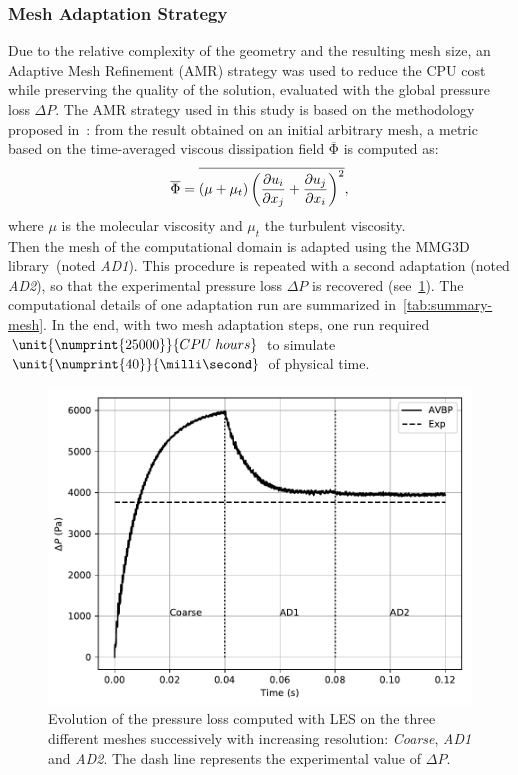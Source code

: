 \subsubsection{Mesh Adaptation Strategy}
Due to the relative complexity of the geometry and the resulting mesh size, an Adaptive Mesh Refinement (AMR) strategy was used to reduce the CPU cost while preserving the quality of the solution, evaluated with the global pressure loss $\Delta P$. The AMR strategy used in this study is based on the methodology proposed in~\cite{Daviller2017}: from the result obtained on an initial arbitrary mesh, a metric based on the time-averaged viscous dissipation field $\mathrm{\overline{\Phi}}$ is computed as: 
\begin{equation}\label{eq:phi}
\mathrm{\overline{\Phi}} = \overline {( \mu + \mu_t) \left(\frac{\partial{u_i}}{\partial{x_j}} + \frac{\partial{u_j}}{\partial{x_i}}\right)^2 },
\end{equation}
where $\mu$ is the molecular viscosity and $\mu_t$ the turbulent viscosity.\\
Then the mesh of the computational domain is adapted using the MMG3D library~\cite{Dapogny2014358}(noted \emph{AD1}). This procedure is repeated with a second adaptation (noted \emph{AD2}), so that the experimental pressure loss $\Delta P$ is recovered (see~\cref{pressure_drop_evolution}). The computational details of one adaptation run are summarized in~\cref{tab:summary-mesh}. In the end, with two mesh adaptation steps, one run required $\unit{\numprint{25000}}{CPU\;hours}$ to simulate $\unit{\numprint{40}}{\milli\second}$ of physical time.

\begin{figure}[!h]
\centering
\includegraphics[width=\linewidth,keepaspectratio]{fig/applications/swirler/losses_swirler_base.pdf}
\caption{Evolution of the pressure loss computed with LES on the three different meshes successively with increasing resolution: \emph{Coarse}, \emph{AD1} and \emph{AD2}. The dash line represents the experimental value of $\Delta P$.}
\label{pressure_drop_evolution}
\end{figure}

